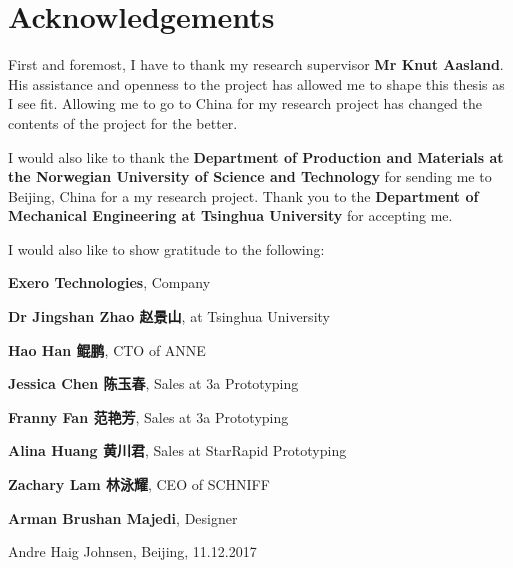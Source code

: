 \thispagestyle{plain}			%

\section*{Acknowledgements}
First and foremost, I have to thank my research supervisor \textbf{Mr Knut Aasland}. His assistance and openness to the project has allowed me to shape this thesis as I see fit. Allowing me to go to China for my research project has changed the contents of the project for the better.
\par
I would also like to thank the \textbf{Department of Production and Materials at the Norwegian University of Science and Technology} for sending me to Beijing, China for a my research project. Thank you to the \textbf{Department of Mechanical Engineering at Tsinghua University} for accepting me.  
\par
I would also like to show gratitude to the following:

\vspace{0.5cm}
\begin{description}
    \begin{CJK*}{UTF8}{gbsn}
    \item \textbf{Exero Technologies}, Company
    \item \textbf{Dr Jingshan Zhao 赵景山}, at Tsinghua University
    \item \textbf{Hao Han 鲲鹏}, CTO of ANNE
    \item \textbf{Jessica Chen 陈玉春}, Sales at 3a Prototyping
    \item \textbf{Franny Fan 范艳芳}, Sales at 3a Prototyping
    \item \textbf{Alina Huang 黄川君}, Sales at StarRapid Prototyping
    \item \textbf{Zachary Lam 林泳耀}, CEO of SCHNIFF
    \item \textbf{Arman Brushan Majedi}, Designer
    \end{CJK*}
\end{description}


\hfill
Andre Haig Johnsen, Beijing, 11.12.2017

\newpage				%
\thispagestyle{empty}
\mbox{}